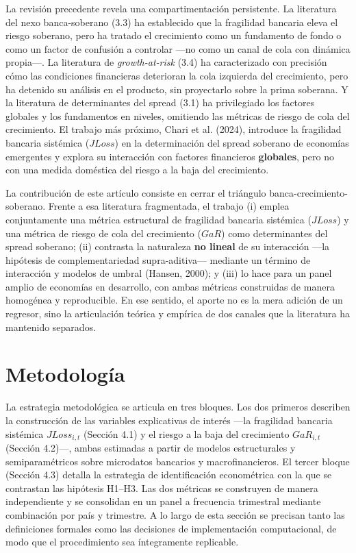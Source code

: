\documentclass[5p,times,twocolumn,authoryear]{elsarticle}
\begin{document}
La revisión precedente revela una compartimentación persistente. La literatura del nexo banca-soberano (3.3) ha establecido que la fragilidad bancaria eleva el riesgo soberano, pero ha tratado el crecimiento como un fundamento de fondo o como un factor de confusión a controlar —no como un canal de cola con dinámica propia—. La literatura de \textit{growth-at-risk} (3.4) ha caracterizado con precisión cómo las condiciones financieras deterioran la cola izquierda del crecimiento, pero ha detenido su análisis en el producto, sin proyectarlo sobre la prima soberana. Y la literatura de determinantes del spread (3.1) ha privilegiado los factores globales y los fundamentos en niveles, omitiendo las métricas de riesgo de cola del crecimiento. El trabajo más próximo, Chari et al. (2024), introduce la fragilidad bancaria sistémica ($JLoss$) en la determinación del spread soberano de economías emergentes y explora su interacción con factores financieros \textbf{globales}, pero no con una medida doméstica del riesgo a la baja del crecimiento.

La contribución de este artículo consiste en cerrar el triángulo banca-crecimiento-soberano. Frente a esa literatura fragmentada, el trabajo (i) emplea conjuntamente una métrica estructural de fragilidad bancaria sistémica ($JLoss$) y una métrica de riesgo de cola del crecimiento ($GaR$) como determinantes del spread soberano; (ii) contrasta la naturaleza \textbf{no lineal} de su interacción —la hipótesis de complementariedad supra-aditiva— mediante un término de interacción y modelos de umbral (Hansen, 2000); y (iii) lo hace para un panel amplio de economías en desarrollo, con ambas métricas construidas de manera homogénea y reproducible. En ese sentido, el aporte no es la mera adición de un regresor, sino la articulación teórica y empírica de dos canales que la literatura ha mantenido separados.


\section{Metodología}

La estrategia metodológica se articula en tres bloques. Los dos primeros describen la construcción de las variables explicativas de interés —la fragilidad bancaria sistémica $JLoss_{i,t}$ (Sección 4.1) y el riesgo a la baja del crecimiento $GaR_{i,t}$ (Sección 4.2)—, ambas estimadas a partir de modelos estructurales y semiparamétricos sobre microdatos bancarios y macrofinancieros. El tercer bloque (Sección 4.3) detalla la estrategia de identificación econométrica con la que se contrastan las hipótesis H1–H3. Las dos métricas se construyen de manera independiente y se consolidan en un panel a frecuencia trimestral mediante combinación por país y trimestre. A lo largo de esta sección se precisan tanto las definiciones formales como las decisiones de implementación computacional, de modo que el procedimiento sea íntegramente replicable.
\end{document}
